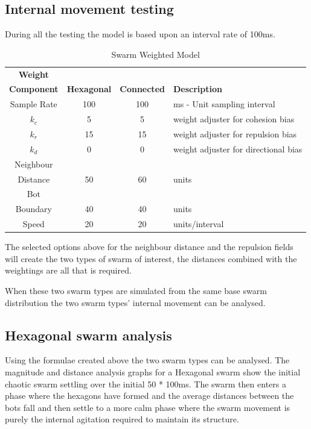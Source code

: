 \documentclass[10pt,journal,letterpaper,twoside]{IEEEtran}
\newcommand{\swarmA}{Hexagonal}
\newcommand{\swarmB}{Connected}
\newcommand{\stability}{internal movement}
\newcommand{\Stability}{Internal movement}
\begin{document}
\subsection{\Stability{} testing}\label{Section:StabilityTesting}

During all the testing the model is based upon an interval rate of 100ms.

\begin{center}
\begin{table}[H]
\begin{tabular}{ c | c | c | p{3cm}}
\bf Weight \\\bf Component & \bf \swarmA{} & \bf \swarmB{} & \bf Description \\ \hline
Sample Rate & 100 & 100 & ms - Unit sampling interval\\  \hline
$k_c$ & 5 & 5 & weight adjuster for cohesion bias\\  \hline
$k_r$ & 15 & 15 & weight adjuster for repulsion  bias\\  \hline
$k_d$ & 0 & 0 & weight adjuster for directional bias\\  \hline
Neighbour \\ Distance & 50 & 60 &  units\\  \hline
Bot \\ Boundary & 40 & 40 & units\\  \hline
Speed & 20 & 20 & units/interval\\  \hline
\end{tabular}
\caption{Swarm Weighted Model} \label{tab:Physics2}
\end{table}
\end{center}

The selected options above for the neighbour distance and the
repulsion fields will create the two types of swarm of interest, the
distances combined with the weightings are all that is required.

When these two swarm types are simulated from the same base swarm
distribution the two swarm types' \stability{} can be analysed.


\subsection{\swarmA{} swarm analysis}

Using the formulae created above the two swarm types can be
analysed. The magnitude and distance analysis graphs for a \swarmA{}
swarm show the initial chaotic swarm settling over the initial 50 *
100ms. The swarm then enters a phase where the hexagons have formed
and the average distances between the bots fall and then settle to a
more calm phase where the swarm movement is purely the internal
agitation required to maintain its structure.
\end{document}
